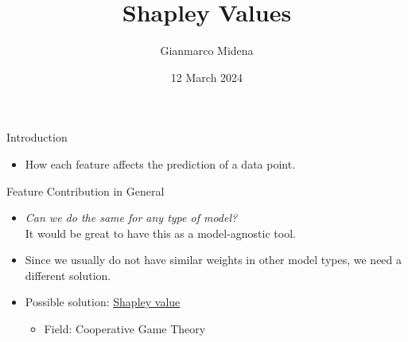 \documentclass[dvipsnames]{beamer}
\title%
{Shapley Values}
\author{Gianmarco Midena}
\institute{Aalto University}
\date{12 March 2024}
\newcommand{\red}[1]{{\color{red} #1}}
\begin{document}
\begin{frame}
\titlepage
\end{frame}


\begin{frame}{Introduction}
	\begin{itemize}
		\item How each feature affects the prediction of a data point.
	\end{itemize}
\end{frame}



\begin{frame}{Feature Contribution in General}
	\begin{itemize}
		\item \emph{Can we do the same for any type of model?}
		\\It would be great to have this as a model-agnostic tool.
		\item \red{Since we usually do not have similar weights in other model types, we need a different solution.}
		\item Possible solution: \underline{Shapley value}
		\begin{itemize}
			\item Field: Cooperative Game Theory
		\end{itemize}
	\end{itemize}
\end{frame}



\end{document}
